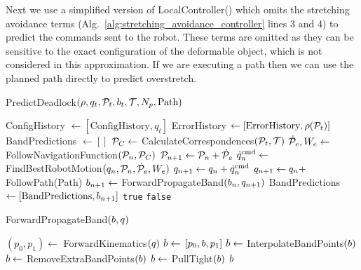 Next we use a simplified version of LocalController() which omits the stretching avoidance terms (Alg.~\ref{alg:stretching_avoidance_controller} lines 3 and 4) to predict the commands sent to the robot. These terms are omitted as they can be sensitive to the exact configuration of the deformable object, which is not considered in this approximation. If we are executing a path then we can use the planned path directly to predict overstretch.


\begin{algorithm}[t]
\caption{PredictDeadlock$(\rho, q_t, \mathcal{P}_t, b_t, \mathcal{T}, N_p, \textrm{Path})$}
\begin{algorithmic}[1]
    \State ConfigHistory $\gets [\textrm{ConfigHistory}, q_t]$
    \State ErrorHistory $\gets [\textrm{ErrorHistory}, \rho(\mathcal{P}_t)]$
    \State BandPredictions $\gets []$
    \State $\mathcal{P}_C \gets$ CalculateCorrespondences$(\mathcal{P}_t, \mathcal{T})$
            \State $\dot{\mathcal{P}}_e, W_e \gets$ FollowNavigationFunction$(\mathcal{P}_n, \mathcal{P}_C)$
            \State $\mathcal{P}_{n + 1} \gets \mathcal{P}_n + \dot{\mathcal{P}}_e$
            \State $\dot{q}^{\textrm{cmd}}_n \gets$ FindBestRobotMotion$(q_n, \mathcal{P}_n, \dot{\mathcal{P}}_e, W_e)$
            \State $q_{n + 1} \gets q_n + \dot{q}^{\textrm{cmd}}_n$
        \Else
            \State $q_{n + 1} \gets q_n + $ FollowPath(Path)
        \EndIf
        \State $b_{n + 1} \gets$ ForwardPropagateBand$(b_n, q_{n + 1})$
        \State BandPredictions $\gets [\textrm{BandPredictions}, b_{n + 1}]$
    \EndFor
        \State \Return \texttt{true}
    \Else
        \State \Return \texttt{false}
    \EndIf
\end{algorithmic}
\label{alg:predict_deadlock}
\end{algorithm}


\begin{algorithm}[t]
\caption{ForwardPropagateBand$(b, q)$}
\begin{algorithmic}[1]
    \State $(p_0, p_1) \gets$ ForwardKinematics$(q)$
    \State $b \gets$ $[p_0, b, p_1]$
    \State $b \gets$ InterpolateBandPoints$(b)$
    \State $b \gets$ RemoveExtraBandPoints$(b)$
    \State $b \gets$ PullTight$(b)$
    \State \Return $b$
\end{algorithmic}
\label{alg:band_propogation}
\end{algorithm}





